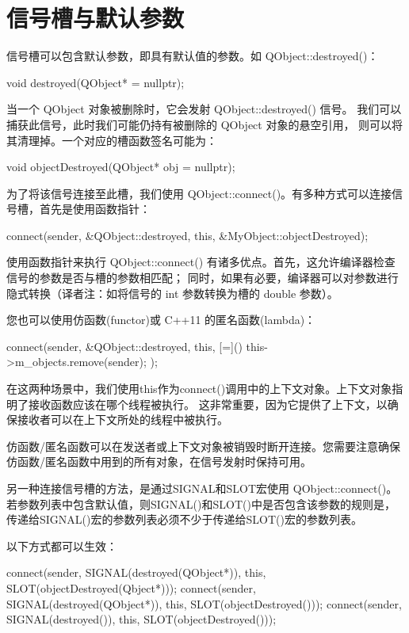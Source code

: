 \section{信号槽与默认参数}

信号槽可以包含默认参数，即具有默认值的参数。如 QObject::destroyed()：

\begin{cppcode}
void destroyed(QObject* = nullptr);
\end{cppcode}

当一个 QObject 对象被删除时，它会发射 QObject::destroyed() 信号。
我们可以捕获此信号，此时我们可能仍持有被删除的 QObject 对象的悬空引用，
则可以将其清理掉。一个对应的槽函数签名可能为：

\begin{cppcode}
void objectDestroyed(QObject* obj = nullptr);
\end{cppcode}

为了将该信号连接至此槽，我们使用 QObject::connect()。有多种方式可以连接信号槽，首先是使用函数指针：

\begin{cppcode}
connect(sender, &QObject::destroyed, this, &MyObject::objectDestroyed);   
\end{cppcode}

使用函数指针来执行 QObject::connect() 有诸多优点。首先，这允许编译器检查信号的参数是否与槽的参数相匹配；
同时，如果有必要，编译器可以对参数进行隐式转换（译者注：如将信号的 int 参数转换为槽的 double 参数）。

您也可以使用仿函数(functor)或 C++11 的匿名函数(lambda)：

\begin{cppcode}
connect(sender, &QObject::destroyed, this, [=](){ this->m_objects.remove(sender); });
\end{cppcode}

在这两种场景中，我们使用this作为connect()调用中的上下文对象。上下文对象指明了接收函数应该在哪个线程被执行。
这非常重要，因为它提供了上下文，以确保接收者可以在上下文所处的线程中被执行。

仿函数/匿名函数可以在发送者或上下文对象被销毁时断开连接。您需要注意确保仿函数/匿名函数中用到的所有对象，在信号发射时保持可用。

另一种连接信号槽的方法，是通过SIGNAL和SLOT宏使用 QObject::connect()。
若参数列表中包含默认值，则SIGNAL()和SLOT()中是否包含该参数的规则是，
传递给SIGNAL()宏的参数列表必须不少于传递给SLOT()宏的参数列表。

以下方式都可以生效：

\begin{cppcode}
 connect(sender, SIGNAL(destroyed(QObject*)), this, SLOT(objectDestroyed(Qbject*)));
 connect(sender, SIGNAL(destroyed(QObject*)), this, SLOT(objectDestroyed()));
 connect(sender, SIGNAL(destroyed()), this, SLOT(objectDestroyed()));
\end{cppcode}

